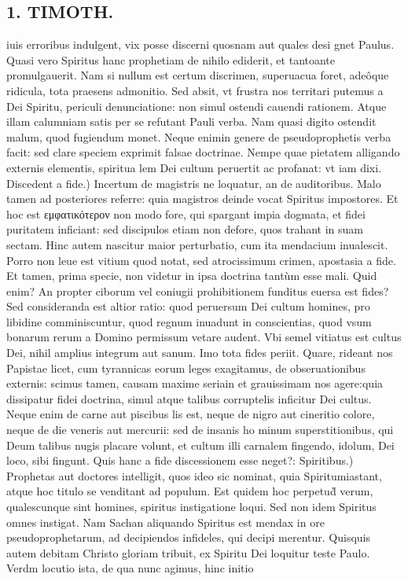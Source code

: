 \documentclass{article}
\begin{document}
\begin{pages}
\section*{1. TIMOTH. }
\marginpar{[ p.44 ]}\pstart iuis erroribus indulgent, vix posse discerni quosnam aut quales desi gnet Paulus. Quasi vero Spiritus hanc prophetiam de nihilo ediderit, et tantoante promulgauerit. Nam si nullum est certum discrimen, superuacua foret, adeôque ridicula, tota praesens admonitio. Sed absit, vt frustra nos territari putemus a Dei Spiritu, periculi denunciatione: non simul ostendi cauendi rationem. Atque illam calumniam satis per se refutant Pauli verba. Nam quasi digito ostendit malum, quod fugiendum monet. Neque enimin genere de pseudoprophetis verba facit: sed clare speciem exprimit falsae doctrinae. Nempe quae pietatem alligando externis elementis, spiritua lem Dei cultum peruertit ac profanat: vt iam dixi.  \pend\pstart Discedent a fide.) Incertum de magistris ne loquatur, an de auditoribus. Malo tamen ad posteriores referre: quia magistros deinde vocat Spiritus impostores. Et hoc est εμφατικότερον non modo fore, qui spargant impia dogmata, et fidei puritatem inficiant: sed discipulos etiam non defore, quos trahant in suam sectam. Hinc autem nascitur maior perturbatio, cum ita mendacium inualescit. Porro non leue est vitium quod notat, sed atrocissimum crimen, apostasia a fide. Et tamen, prima specie, non videtur in ipsa doctrina tantùm esse mali. Quid enim? An propter ciborum vel coniugii prohibitionem funditus euersa est fides? Sed consideranda est altior ratio: quod peruersum Dei cultum homines, pro libidine comminiscuntur, quod regnum inuadunt in conscientias, quod vsum bonarum rerum a Domino permissum vetare audent. Vbi semel vitiatus est cultus Dei, nihil amplius integrum aut sanum. Imo tota fides periit. Quare, rideant nos Papistae licet, cum tyrannicas eorum leges exagitamus, de obseruationibus externis: scimus tamen, causam maxime seriain et grauissimam nos agere:quia dissipatur fidei doctrina, simul atque talibus corruptelis inficitur Dei cultus. Neque enim de carne aut piscibus lis est, neque de nigro aut cineritio colore, neque de die veneris aut mercurii: sed de insanis ho minum superstitionibus, qui Deum talibus nugis placare volunt, et cultum illi carnalem fingendo, idolum, Dei loco, sibi fingunt. Quis hanc a fide discessionem esse neget?:  \pend\pstart Spiritibus.) Prophetas aut doctores intelligit, quos ideo sic nominat, quia Spiritumiastant, atque hoc titulo se venditant ad populum. Est quidem hoc perpetud̀ verum, qualescunque sint homines, spiritus instigatione loqui. Sed non idem Spiritus omnes instigat. Nam Sachan aliquando Spiritus est mendax in ore pseudoprophetarum, ad decipiendos infideles, qui decipi merentur. Quisquis autem debitam Christo gloriam tribuit, ex Spiritu Dei loquitur teste Paulo. Verdm locutio ista, de qua nunc agimus, hinc initio  \pend

\end{pages}
\end{document}

